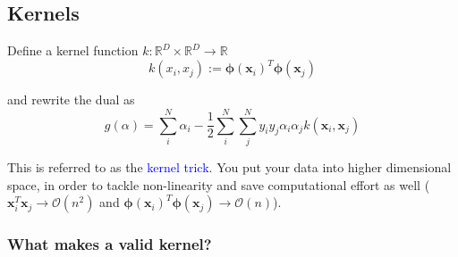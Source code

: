 \documentclass[a4paper,10pt,twoside=true,DIV=10,headsepline,plainheadsepline]{scrartcl}
\begin{document}
		\begin{center}
		\end{center}

		\subsection{Kernels}
		Define a kernel function $k : \mathbb{R}^D \times \mathbb{R}^D \rightarrow \mathbb{R}$ 				\begin{equation} 
				k ( x_i, x_j) := \mathbf{\phi}(\mathbf{x}_i)^T \mathbf{\phi}(\mathbf{x}_j)
			\end{equation}

		and rewrite the dual as
			\begin{equation} 
				g(\alpha) = \sum_i^N \alpha_i - \frac{1}{2} \sum_i^N \sum_j^N y_i y_j \alpha_i \alpha_j k(\mathbf{x}_i, \mathbf{x}_j)
			\end{equation}
			\newline

		This is referred to as the \textcolor{blue}{kernel trick}. You put your data into higher dimensional space, in order to tackle non-linearity and save computational effort as well ($ \mathbf{x}_i^T \mathbf{x}_j \rightarrow \mathcal{O} (n^2)$ and $\mathbf{\phi}(\mathbf{x}_i)^T \mathbf{\phi}(\mathbf{x}_j) \rightarrow \mathcal{O} (n)$).

		\subsubsection{What makes a valid kernel?}
\end{document}
